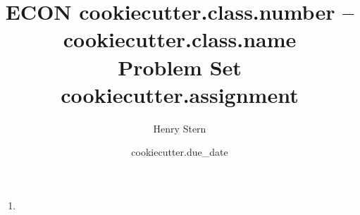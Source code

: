 \documentclass{article}
\title{ECON{{ cookiecutter.class.number }} -- {{ cookiecutter.class.name }} \\Problem Set {{ cookiecutter.assignment }}}
\author{Henry Stern}
\date{ {{ cookiecutter.due_date }} }
\begin{document}
\maketitle

\begin{problem}

\end{problem}

\begin{solution}

\end{solution}

\begin{problem}

\end{problem}

\begin{enumerate}
    \item \textit{}
    \begin{solution}
    
    \end{solution}
\end{enumerate}
\end{document}
